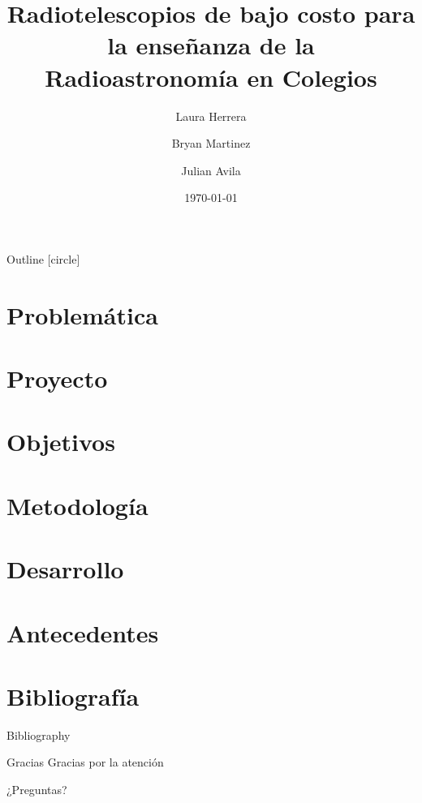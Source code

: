 \documentclass[aspectratio=169,sn-mathphys-num,spanish]{beamer}
\title{Radiotelescopios de bajo costo para la enseñanza de la Radioastronomía en Colegios}
\author{Laura Herrera \and Bryan Martinez \and Julian Avila}
\institute{Universidad Distrital Francisco José de Caldas}
\date{\today}
\begin{document}
\begin{frame}
	\titlepage
\end{frame}

\begin{frame}{Outline}
	[circle]
	\tableofcontents
\end{frame}

\section{Problemática}


\section{Proyecto}


\section{Objetivos}


\section{Metodología}


\section{Desarrollo}


\section{Antecedentes}


\section{Bibliografía}
\begin{frame}[allowframebreaks]{Bibliography}
	\printbibliography
	\nocite{*}
\end{frame}

\begin{frame}{Gracias}
	\centering
	{\LARGE Gracias por la atención}
	\vspace{0.5cm}

\Large ¿Preguntas?
\end{frame}
\end{document}

